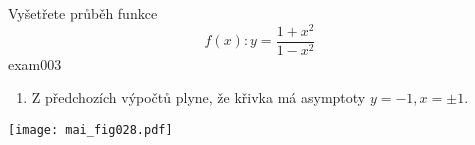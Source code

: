 \begin{mathexam}{Vyšetřete průběh funkce \[f(x):y=\frac{1+x^2}{1-x^2}\]}{exam003}
\begin{enumerate}[noitemsep,leftmargin=12pt,rightmargin=2pt, label=\emph{\alph*})]
        \footnote{stacionární bod}  pak dosadíme do druhé derivace, tj. 
        $$y''(0)=\frac{4(3\cdot0^2+1)}{(1-0^2 )^3}=4,$$ protože je \(f''(x)>0\), má v bodě \(x_0\)
        lokální minimum. Můžeme rovněž konstatovat, že funkce nemá inflexní body \footnote{Pro
        existenci inflexního bodu je nutné splnění jedné z podmínek a to buď \(f''(x_0)=0\), nebo
        \(f''(x_0)\) neexistuje.}. Konkávnost a konvexnost funkce v intervalech \(\langle0,1)\) a
        \((1,\infty)\) vyšetříme pomocí vlastností druhé derivace funkce. Tedy
        \begin{itemize}
          \item \(\langle0,1): y''=\frac{4(3x^2+1)}{(1-x^2 )^3} >0 \Rightarrow\) funkce je v tomto
                intervalu \textbf{konvexní},
          \item \((1,\infty): y''=\frac{4(3x^2+1)}{(1-x^2 )^3} <0 \Rightarrow\) funkce je v tomto
                intervalu \textbf{konkáv\-ní}.
        \end{itemize}
    \item Z předchozích výpočtů plyne, že křivka má asymptoty \(y=-1,x=\pm1\).
  \end{enumerate}
  {\centering \captionsetup{type=figure}          %
    \texttt{[image: mai\_fig028.pdf]}
    \label{mai:fig_028}
  \par}
\end{mathexam}  